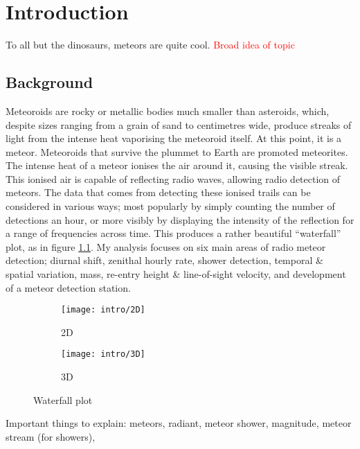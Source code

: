 \chapter{Introduction}
To all but the dinosaurs, meteors are quite cool.
\textcolor{red}{Broad idea of topic}
\section{Background}
Meteoroids are rocky or metallic bodies much smaller than asteroids, which, despite sizes ranging from a grain of sand to centimetres wide, produce streaks of light from the intense heat vaporising the meteoroid itself. At this point, it is a meteor. Meteoroids that survive the plummet to Earth are promoted meteorites. \\
The intense heat of a meteor ionises the air around it, causing the visible streak. This ionised air is capable of reflecting radio waves, allowing radio detection of meteors. The data that comes from detecting these ionised trails can be considered in various ways; most popularly by simply counting the number of detections an hour, or more visibly by displaying the intensity of the reflection for a range of frequencies across time. This produces a rather beautiful ``waterfall'' plot, as in figure \ref{fig:waterfall}.
My analysis focuses on six main areas of radio meteor detection; diurnal shift, zenithal hourly rate, shower detection, temporal \& spatial variation, mass, re-entry height \& line-of-sight velocity, and development of a meteor detection station. 
\begin{figure}[h!]
	\centering
	\begin{subfigure}{.24\textwidth}
		\texttt{[image: intro/2D]}
		\caption{2D}
	\end{subfigure}
	\begin{subfigure}{.24\textwidth}
		\texttt{[image: intro/3D]}
		\caption{3D}
	\end{subfigure}
	\caption{Waterfall plot 
	\label{fig:waterfall}}
\end{figure}

Important things to explain: meteors, radiant, meteor shower, magnitude, meteor stream (for showers), 
